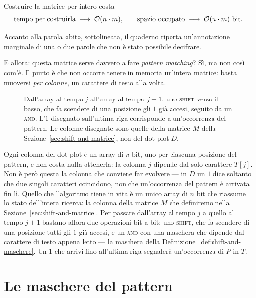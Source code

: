 Costruire la matrice per intero costa
\[
  \text{tempo per costruirla}\;\longrightarrow\;\Oh(n\cdot m),
  \qquad
  \text{spazio occupato}\;\longrightarrow\;\Oh(n\cdot m)\ \text{bit}.
\]

\begin{dubbio}
Accanto alla parola «bit», sottolineata, il quaderno riporta un'annotazione marginale di una o
due parole che non è stato possibile decifrare.
\end{dubbio}

E allora: questa matrice serve davvero a fare \emph{pattern matching}? Sì, ma non così com'è. Il
punto è che non occorre tenere in memoria un'intera matrice: basta muoversi \emph{per colonne},
un carattere di testo alla volta.

\begin{figure}[H]
\centering

\caption{Dall'array al tempo $j$ all'array al tempo $j+1$: uno \textsc{shift} verso il basso, che
fa scendere di una posizione gli $1$ già accesi, seguito da un \textsc{and}. L'$1$ disegnato
sull'ultima riga corrisponde a un'occorrenza del pattern. Le colonne disegnate sono quelle della
matrice $M$ della Sezione~\ref{sec:shift-and-matrice}, non del dot-plot $D$.}
\label{fig:shift-and-colonne}
\end{figure}

Ogni colonna del dot-plot è un array di $n$ bit, uno per ciascuna posizione del pattern, e non
costa nulla ottenerla: la colonna $j$ dipende dal solo carattere $T[j]$. Non è però questa la
colonna che conviene far evolvere --- in $D$ un $1$ dice soltanto che due singoli caratteri
coincidono, non che un'occorrenza del pattern è arrivata fin lì. Quello che l'algoritmo tiene in
vita è un unico array di $n$ bit che riassume lo stato dell'intera ricerca: la colonna della
matrice $M$ che definiremo nella Sezione~\ref{sec:shift-and-matrice}. Per passare dall'array al
tempo $j$ a quello al tempo $j+1$ bastano allora due operazioni bit a bit: uno \textsc{shift},
che fa scendere di una posizione tutti gli $1$ già accesi, e un \textsc{and} con una maschera che
dipende dal carattere di testo appena letto --- la maschera della
Definizione~\ref{def:shift-and-maschere}. Un $1$ che arrivi fino all'ultima riga segnalerà
un'occorrenza di $P$ in $T$.


\section{Le maschere del pattern}

